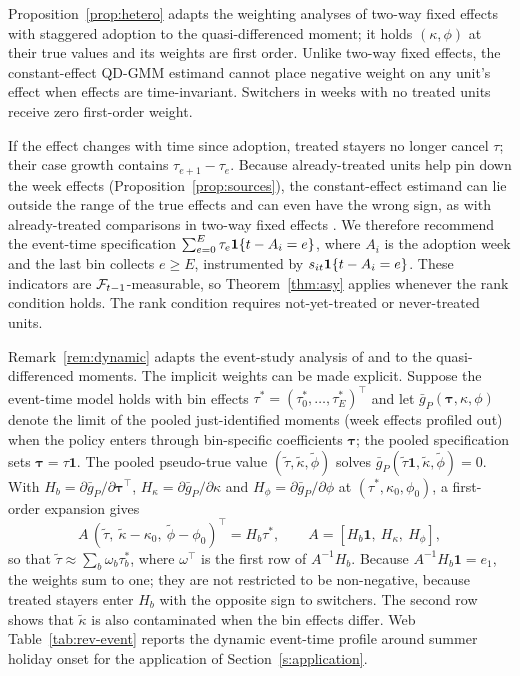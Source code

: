Proposition~\ref{prop:hetero} adapts the weighting analyses of two-way fixed effects with
staggered adoption \citep{goodmanbacon2021did,dechaisemartin2020twfe} to the quasi-differenced
moment; it holds $(\kappa,\phi)$ at their true values and its weights are first order. Unlike two-way
fixed effects, the constant-effect QD-GMM estimand cannot place negative weight on any unit's effect
when effects are time-invariant. Switchers in weeks
with no treated units receive zero first-order weight.

\begin{remark}
\label{rem:dynamic}
If the effect changes with time since adoption, treated stayers no longer cancel $\tau$; their
case growth contains $\tau_{e+1}-\tau_e$. Because already-treated units help pin down the week
effects (Proposition~\ref{prop:sources}), the constant-effect estimand can lie outside the range of
the true effects and can even have the wrong sign, as with already-treated comparisons in
two-way fixed effects \citep{goodmanbacon2021did}. We therefore recommend the event-time
specification $\sum_{e=0}^{E}\tau_e\mathbf{1}\{t-A_i=e\}$, where $A_i$ is the adoption week and the
last bin collects $e\ge E$,
instrumented by $s_{it}\mathbf{1}\{t-A_i=e\}$. These indicators are $\mathcal{F}_{t-1}$-measurable, so
Theorem~\ref{thm:asy} applies whenever the rank condition holds. The rank condition requires
not-yet-treated or never-treated units.
\end{remark}

Remark~\ref{rem:dynamic} adapts the event-study analysis of \citet{sun2021estimating} and
\citet{borusyak2024imputation} to the quasi-differenced moments. The implicit weights can be made
explicit. Suppose the event-time model holds with bin effects $\tau^*=(\tau^*_0,\dots,\tau^*_E)^{\top}$
and let $\bar g_P(\boldsymbol\tau,\kappa,\phi)$ denote the limit of the pooled just-identified moments
(week effects profiled out) when the policy enters through bin-specific coefficients
$\boldsymbol\tau$; the pooled specification sets $\boldsymbol\tau=\tau\mathbf 1$. The pooled
pseudo-true value $(\tilde\tau,\tilde\kappa,\tilde\phi)$ solves $\bar g_P(\tilde\tau\mathbf
1,\tilde\kappa,\tilde\phi)=0$. With $H_b=\partial\bar g_P/\partial\boldsymbol\tau^{\top}$,
$H_\kappa=\partial\bar g_P/\partial\kappa$ and $H_\phi=\partial\bar g_P/\partial\phi$ at
$(\tau^*,\kappa_0,\phi_0)$, a first-order expansion gives
\[
A\,(\tilde\tau,\ \tilde\kappa-\kappa_0,\ \tilde\phi-\phi_0)^{\top}=H_b\tau^*,\qquad
A=[H_b\mathbf 1,\ H_\kappa,\ H_\phi],
\]
so that $\tilde\tau\approx\sum_{b}\omega_b\tau^*_b$, where $\omega^{\top}$ is the first row of
$A^{-1}H_b$. Because $A^{-1}H_b\mathbf 1=e_1$, the weights sum to one; they are not restricted to be
non-negative, because treated stayers enter $H_b$ with the opposite sign to switchers. The second row
shows that $\tilde\kappa$ is also contaminated when the bin effects differ. Web
Table~\ref{tab:rev-event} reports the dynamic event-time profile around summer holiday onset for
the application of Section~\ref{s:application}.

